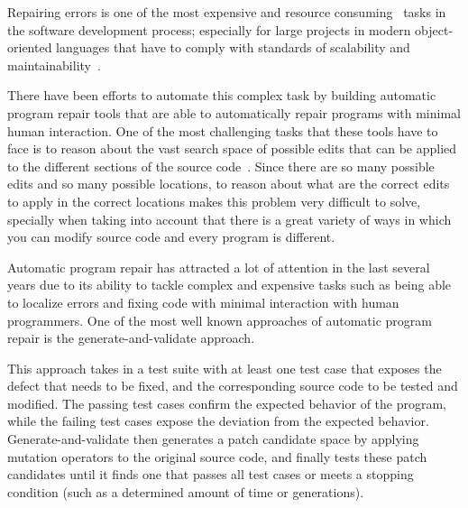 \documentclass[conference]{IEEEtran}
\newcommand{\todo}[1]
  {{\scriptsize \textbf{\color{red} {#1}}}}
\begin{document}


Repairing errors is one of the most expensive\cite{Tassey02,Britton13} and 
resource consuming~\cite{Weiss07} tasks in 
the software development process; especially for large projects in modern 
object-oriented languages that have to comply with standards of scalability and 
maintainability~\cite{Liblit03,Anvik05}. 

There have been efforts to automate this complex task by 
building automatic program repair tools that are able to automatically repair 
programs with minimal human interaction. One 
of the most challenging tasks that 
these tools have to face is to reason about the vast search space of possible 
edits that can be applied to the different sections of the source 
code~\cite{long16}. Since 
there are so many possible edits and so many possible locations, to reason about 
what are the correct edits to apply in the correct locations makes this problem 
very difficult to solve, specially when taking into account that there is a 
great variety of ways in which you can modify source code and every program is 
different.

Automatic program repair has attracted a lot of attention in the last several
years due to its ability to tackle complex and expensive tasks such as being
able to localize errors and fixing code with minimal interaction with human
programmers. One of the most well known approaches of automatic program repair
is the generate-and-validate approach. 

This approach takes in a test suite with at least one test case that exposes 
the defect that needs to be fixed, and the corresponding source code to be 
tested and modified. The passing test cases confirm the
expected behavior of the program, while the failing test cases expose the
deviation from the expected behavior. 
Generate-and-validate then generates a patch candidate space by applying 
mutation operators to the original source code, and finally tests these patch 
candidates until it finds one that passes all test cases or meets a stopping 
condition (such as a determined amount of time or generations). 
\end{document}
